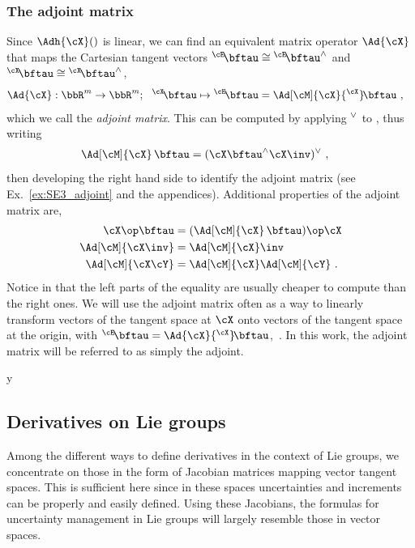 \subsubsection{The adjoint matrix}
Since $\Adh{\cX}()$ is linear, we can find an equivalent matrix operator $\Ad{\cX}$ that maps the Cartesian tangent vectors ${^\cE}\!\bftau\cong{^\cE}\!\bftau\hhat$ and ${^\cX}\!\bftau\cong{^\cX}\!\bftau\hhat$,
%
\begin{align}
\Ad{\cX}:\bbR^m\to\bbR^m;~~ ^\cX\!\bftau\mapsto {^\cE}\!\bftau &= \Ad[\cM]{\cX}{^\cX}\!\bftau \label{equ:Adj2} 
~,
\end{align}
%
which we call the \emph{adjoint matrix}. This can be computed by applying $^\vee$ to , thus writing
%
\begin{align}\label{equ:Adj4} 
\Ad[\cM]{\cX}\,\bftau &= (\cX\bftau\hhat\cX\inv)\vvee 
~,
\end{align}
%
then developing the right hand side to identify the adjoint matrix (see Ex.~\ref{ex:SE3_adjoint} and the appendices).
Additional properties of the adjoint matrix are,
%
\begin{align}
\cX\op\bftau &= (\Ad[\cM]{\cX}\,\bftau)\op\cX \label{equ:Adj1} \\
\Ad[\cM]{\cX\inv} &= \Ad[\cM]{\cX}\inv \label{equ:Adj5} \\
\Ad[\cM]{\cX\cY} &=\Ad[\cM]{\cX}\Ad[\cM]{\cY} \label{equ:Adj7}
~.
\end{align}
%
Notice in  that the left parts of the equality are usually cheaper to compute than the right ones.
We will use the adjoint matrix often as a way to linearly transform vectors of the tangent space at $\cX$ onto vectors of the tangent space at the origin, with ${^\cE}\!\bftau = \Ad{\cX}{^\cX}\!\bftau$,~.
In this work, the adjoint matrix will be referred to as simply the adjoint.



\if\examples y

\fi




\subsection{Derivatives on Lie groups}

Among the different ways to define derivatives in the context of Lie groups, we concentrate on those in the form of Jacobian matrices mapping vector tangent spaces. 
This is sufficient here since in these spaces uncertainties and increments can be properly and easily defined.
Using these Jacobians, the formulas for uncertainty management in Lie groups will largely resemble those in vector spaces.

